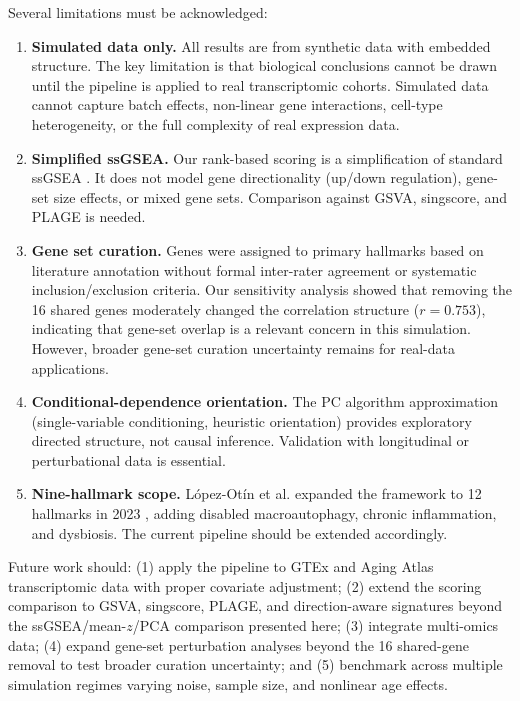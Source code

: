 \documentclass[11pt,a4paper]{article}
\begin{document}
Several limitations must be acknowledged:
\begin{enumerate}[noitemsep]
    \item \textbf{Simulated data only.} All results are from synthetic data with embedded structure. The key limitation is that biological conclusions cannot be drawn until the pipeline is applied to real transcriptomic cohorts. Simulated data cannot capture batch effects, non-linear gene interactions, cell-type heterogeneity, or the full complexity of real expression data.
    \item \textbf{Simplified ssGSEA.} Our rank-based scoring is a simplification of standard ssGSEA \citep{barbie2009systematic}. It does not model gene directionality (up/down regulation), gene-set size effects, or mixed gene sets. Comparison against GSVA, singscore, and PLAGE is needed.
    \item \textbf{Gene set curation.} Genes were assigned to primary hallmarks based on literature annotation without formal inter-rater agreement or systematic inclusion/exclusion criteria. Our sensitivity analysis showed that removing the 16 shared genes moderately changed the correlation structure ($r = 0.753$), indicating that gene-set overlap is a relevant concern in this simulation. However, broader gene-set curation uncertainty remains for real-data applications.
    \item \textbf{Conditional-dependence orientation.} The PC algorithm approximation (single-variable conditioning, heuristic orientation) provides exploratory directed structure, not causal inference. Validation with longitudinal or perturbational data is essential.
    \item \textbf{Nine-hallmark scope.} L\'{o}pez-Ot\'{i}n et al. expanded the framework to 12 hallmarks in 2023 \citep{lopez2023hallmarks}, adding disabled macroautophagy, chronic inflammation, and dysbiosis. The current pipeline should be extended accordingly.
\end{enumerate}

Future work should: (1) apply the pipeline to GTEx and Aging Atlas transcriptomic data with proper covariate adjustment; (2) extend the scoring comparison to GSVA, singscore, PLAGE, and direction-aware signatures beyond the ssGSEA/mean-$z$/PCA comparison presented here; (3) integrate multi-omics data; (4) expand gene-set perturbation analyses beyond the 16 shared-gene removal to test broader curation uncertainty; and (5) benchmark across multiple simulation regimes varying noise, sample size, and nonlinear age effects.
\end{document}
